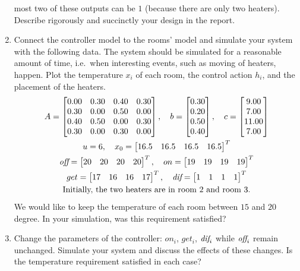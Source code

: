 \documentclass[11]{article}
\begin{document}
\begin{enumerate}
  most two of these outputs can be $1$ (because there are only
  two heaters).  Describe rigorously and succinctly your design in the
  report.
\item Connect the controller model to the rooms' model and simulate
  your system with the following data.  The system should be simulated
  for a reasonable amount of time, i.e.\ when interesting events, such
  as moving of heaters, happen.  Plot the temperature $x_i$ of each
  room, the control action $h_i$, and the placement of the heaters.
  \begin{gather*}
    A = \begin{bmatrix}
      0.00 & 0.30 & 0.40 & 0.30 \\
      0.30 & 0.00 & 0.50 & 0.00 \\
      0.40 & 0.50 & 0.00 & 0.30 \\
      0.30 & 0.00 & 0.30 & 0.00
    \end{bmatrix}, \quad
    b = \begin{bmatrix} 0.30 \\ 0.20 \\ 0.50 \\ 0.40 \end{bmatrix},
    \quad
    c = \begin{bmatrix} 9.00 \\ 7.00 \\ 11.00 \\ 7.00 \end{bmatrix}
    \\
    u = 6, \quad
    x_0 = \begin{bmatrix} 16.5 & 16.5 & 16.5 & 16.5 \end{bmatrix}^T
    \\
    \mbox{{\it off}} = \begin{bmatrix} 20 & 20 & 20 & 20 \end{bmatrix}^T, \quad
    on = \begin{bmatrix} 19 & 19 & 19 & 19 \end{bmatrix}^T
    \\
    get = \begin{bmatrix} 17 & 16 & 16 & 17 \end{bmatrix}^T, \quad
    \mbox{{\it dif}} = \begin{bmatrix} 1 & 1 & 1 & 1 \end{bmatrix}^T
    \\
    \text{Initially, the two heaters are in room $2$ and room $3$.}
  \end{gather*}
  We would like to keep the temperature of each room between $15$ and $20$
  degree.  In your simulation, was this requirement satisfied?
\item Change the parameters of the controller: $on_i$, $get_i$,
  $\mbox{{\it dif}}_i$ while $\mbox{{\it off}}_i$ remain unchanged.  Simulate your system and
  discuss the effects of these changes.  Is the temperature
  requirement satisfied in each case?
\end{enumerate}
\end{document}

